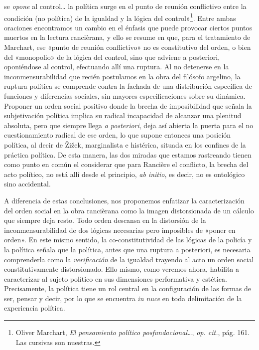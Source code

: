 se \emph{opone} al control\ldots{} la política surge en el punto de reunión conflictivo entre la condición (no política) de la igualdad y la lógica del control»\footnote{Oliver Marchart, \emph{El pensamiento político posfundacional\ldots{}}, \emph{op. cit.}, pág. 161. Las cursivas son nuestras.}. Entre ambas oraciones encontramos un cambio en el énfasis que puede provocar ciertos puntos muertos en la lectura rancièrana, y ello se resume en que, para el tratamiento de Marchart, ese «punto de reunión conflictivo» no es constitutivo del orden, o bien del «monopolio» de la lógica del control, sino que adviene a posteriori, oponiéndose al control, efectuando allí una ruptura. Al no detenerse en la inconmensurabilidad que recién postulamos en la obra del filósofo argelino, la ruptura política se comprende contra la fachada de una distribución específica de funciones y diferencias sociales, sin mayores especificaciones sobre su dinámica. Proponer un orden social positivo donde la brecha de imposibilidad que señala la subjetivación política implica su radical incapacidad de alcanzar una plenitud absoluta, pero que siempre llega \emph{a posteriori}, deja así abierta la puerta para el no cuestionamiento radical de ese orden, lo que supone entonces una posición política, al decir de Žižek, marginalista e histérica, situada en los confines de la práctica política. De esta manera, las dos miradas que estamos rastreando tienen como punto en común el considerar que para Rancière el conflicto, la brecha del acto político, no está allí desde el principio, \emph{ab initio}, es decir, no es ontológico sino accidental.

A diferencia de estas conclusiones, nos proponemos enfatizar la caracterización del orden social en la obra rancièrana como la imagen distorsionada de un cálculo que siempre deja resto. Todo orden descansa en la distorsión de la inconmensurabilidad de dos lógicas necesarias pero imposibles de «poner en orden». En este mismo sentido, la co-constitutividad de las lógicas de la policía y la política señala que la política, antes que una ruptura a posteriori, es necesaria comprenderla como la \emph{verificación} de la igualdad trayendo al acto un orden social constitutivamente distorsionado. Ello mismo, como veremos ahora, habilita a caracterizar al sujeto político en sus dimensiones performativa y estética. Precisamente, la política tiene un rol central en la configuración de las formas de ser, pensar y decir, por lo que se encuentra \emph{in nuce} en toda delimitación de la experiencia política.

